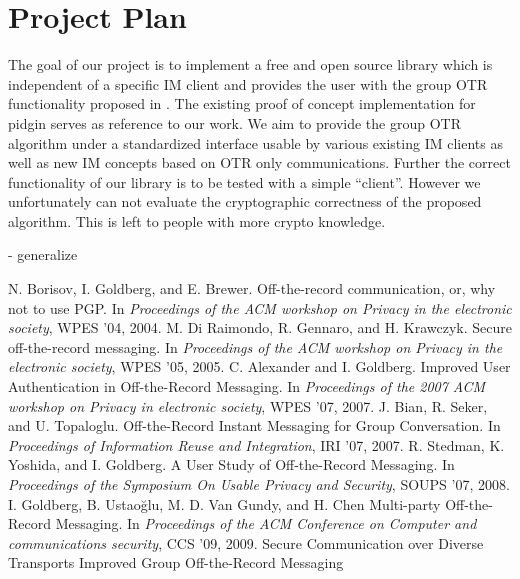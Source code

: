 \section{Project Plan}
The goal of our project is to implement a free and open source library which is independent of a specific IM client and provides the user with the group OTR functionality proposed in \cite{impr-gotr}. The existing proof of concept implementation for pidgin serves as reference to our work. We aim to provide the group OTR algorithm under a standardized interface usable by various existing IM clients as well as new IM concepts based on OTR only communications. Further the correct functionality of our library is to be tested with a simple “client”. However we unfortunately can not evaluate the cryptographic correctness of the proposed algorithm. This is left to people with more crypto knowledge.

- generalize

\begin{thebibliography}{xx}
	 N. Borisov, I. Goldberg, and E. Brewer. Off-the-record communication, or, why not to use PGP. In \textit{Proceedings of the ACM workshop on Privacy in the electronic society}, WPES ’04, 2004.
	 M. Di Raimondo, R. Gennaro, and H. Krawczyk. Secure off-the-record messaging. In \textit{Proceedings of the ACM workshop on Privacy in the electronic society}, WPES ’05, 2005.
	 C. Alexander and I. Goldberg. Improved User Authentication in Off-the-Record Messaging. In \textit{Proceedings of the 2007 ACM workshop on Privacy in electronic society}, WPES ’07, 2007.
	 J. Bian, R. Seker, and U. Topaloglu. Off-the-Record Instant Messaging for Group Conversation. In \textit{Proceedings of Information Reuse and Integration}, IRI ’07, 2007.
	 R. Stedman, K. Yoshida, and I. Goldberg. A User Study
		of Off-the-Record Messaging. In \textit{Proceedings of the Symposium On
	Usable Privacy and Security}, SOUPS ’07, 2008.
	 I. Goldberg, B. Ustaoğlu, M. D. Van Gundy, and H. Chen
		Multi-party Off-the-Record Messaging. In \textit{Proceedings of the ACM
		Conference on Computer and communications security}, CCS ’09, 2009.
	 Secure Communication over Diverse Transports
	 Improved Group Off-the-Record Messaging
\end{thebibliography}


